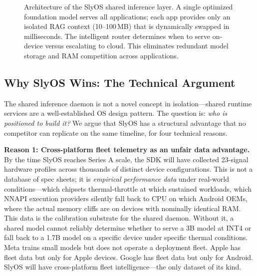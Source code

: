 \documentclass[12pt, letterpaper, twoside]{report}
\begin{document}
\begin{figure}[H]
{%
}
\caption{Architecture of the SlyOS shared inference layer. A single optimized foundation model serves all applications; each app provides only an isolated RAG context (10--100\,MB) that is dynamically swapped in milliseconds. The intelligent router determines when to serve on-device versus escalating to cloud. This eliminates redundant model storage and RAM competition across applications.}
\label{fig:shared_daemon}
\end{figure}

\subsection{Why SlyOS Wins: The Technical Argument}

The shared inference daemon is not a novel concept in isolation---shared runtime services are a well-established OS design pattern. The question is: \textit{who is positioned to build it?} We argue that SlyOS has a structural advantage that no competitor can replicate on the same timeline, for four technical reasons.

\textbf{Reason 1: Cross-platform fleet telemetry as an unfair data advantage.} By the time SlyOS reaches Series A scale, the SDK will have collected 23-signal hardware profiles across thousands of distinct device configurations. This is not a database of spec sheets; it is \textit{empirical performance data} under real-world conditions---which chipsets thermal-throttle at which sustained workloads, which NNAPI execution providers silently fall back to CPU on which Android OEMs, where the actual memory cliffs are on devices with nominally identical RAM. This data is the calibration substrate for the shared daemon. Without it, a shared model cannot reliably determine whether to serve a 3B model at INT4 or fall back to a 1.7B model on a specific device under specific thermal conditions. Meta trains small models but does not operate a deployment fleet. Apple has fleet data but only for Apple devices. Google has fleet data but only for Android. SlyOS will have cross-platform fleet intelligence---the only dataset of its kind.
\end{document}
